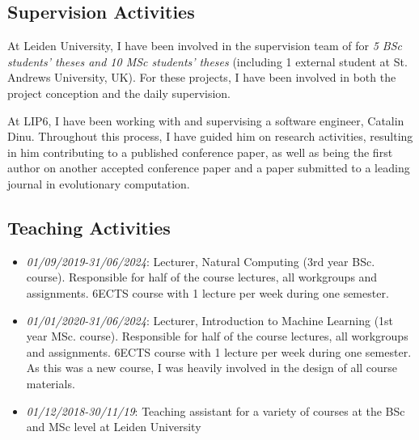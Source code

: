 

\subsection*{Supervision Activities}
At Leiden University, I have been involved in the supervision team of for \emph{5 BSc students’ theses and 10 MSc students’ theses} (including 1 external student at St. Andrews University, UK). For these projects, I have been involved in both the project conception and the daily supervision.

At LIP6, I have been working with and supervising a software engineer, Catalin Dinu. Throughout this process, I have guided him on research activities, resulting in him contributing to a published conference paper, as well as being the first author on another accepted conference paper and a paper submitted to a leading journal in evolutionary computation. 

\subsection*{Teaching Activities}
\begin{itemize}
    \item[] \textit{01/09/2019-31/06/2024}: Lecturer, Natural Computing (3rd year BSc. course). Responsible for half of the course lectures, all workgroups and assignments. 6ECTS course with 1 lecture per week during one semester.
    \item[] \textit{01/01/2020-31/06/2024}: Lecturer, Introduction to Machine Learning (1st year MSc. course). Responsible for half of the course lectures, all workgroups and assignments. 6ECTS course with 1 lecture per week during one semester. As this was a new course, I was heavily involved in the design of all course materials. 
    \item[] \textit{01/12/2018-30/11/19}: Teaching assistant for a variety of courses at the BSc and MSc level at Leiden University
\end{itemize}

